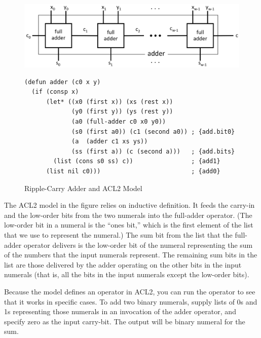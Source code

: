 \begin{figure}
\begin{center}
\includegraphics[scale=0.25]{Images/adder.png}
\begin{Verbatim}
(defun adder (c0 x y)
  (if (consp x)
      (let* ((x0 (first x)) (xs (rest x))
             (y0 (first y)) (ys (rest y))
             (a0 (full-adder c0 x0 y0))
             (s0 (first a0)) (c1 (second a0)) ; {add.bit0}
             (a  (adder c1 xs ys))
             (ss (first a)) (c (second a)))   ; {add.bits}
        (list (cons s0 ss) c))                ; {add1}
      (list nil c0)))                         ; {add0}
\end{Verbatim}
\end{center}
\caption{Ripple-Carry Adder and ACL2 Model}
\label{fig:adder}
\end{figure}

The ACL2 model in the figure relies
on inductive definition. It feeds the carry-in and
the low-order bits from the two numerals into the \textsf{full-adder} operator.
(The low-order bit in a numeral is the ``ones bit,''
which is the first element of the list that we use to
represent the numeral.)
The sum bit from the list that the \textsf{full-adder} operator delivers
is the low-order bit of the numeral representing the sum of
the numbers that the input numerals represent.
The remaining sum bits in the list are those delivered by
the \textsf{adder} operating on the other bits in the input numerals
(that is, all the bits in the input numerals except the low-order bits).

Because the model defines an operator in ACL2,
you can run the operator to see that it works in specific cases.
To add two binary numerals, supply lists of
0s and 1s
representing those numerals in an invocation
of the \textsf{adder} operator, and specify zero as the input carry-bit.
The output will be binary numeral for the sum.

